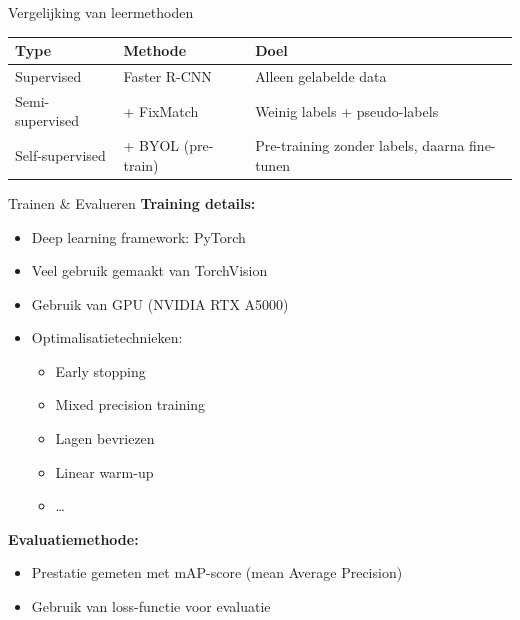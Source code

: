 \documentclass[aspectratio=169]{beamer}
\begin{document}
    \begin{frame}{Vergelijking van leermethoden}
        \centering
        \begin{tabular}{lll}
            \toprule
            \textbf{Type} & \textbf{Methode} & \textbf{Doel} \\
            \midrule
            Supervised      & Faster R-CNN       & Alleen gelabelde data \\
            Semi-supervised & + FixMatch         & Weinig labels + pseudo-labels \\
            Self-supervised & + BYOL (pre-train) & Pre-training zonder labels, daarna fine-tunen \\
            \bottomrule
        \end{tabular}
    \end{frame}
    
    \begin{frame}{Trainen \& Evalueren}
        \textbf{Training details:}
        \begin{itemize}
            \item Deep learning framework: PyTorch
            \item Veel gebruik gemaakt van TorchVision
            \item Gebruik van GPU (NVIDIA RTX A5000)
            \item Optimalisatietechnieken:
            \begin{itemize}
                \item Early stopping
                \item Mixed precision training
                \item Lagen bevriezen
                \item Linear warm-up
                \item \dots
            \end{itemize}
        \end{itemize}
        \textbf{Evaluatiemethode:}
        \begin{itemize}
            \item Prestatie gemeten met mAP-score (mean Average Precision)
            \item Gebruik van loss-functie voor evaluatie
        \end{itemize}
    \end{frame}
    
\end{document}

